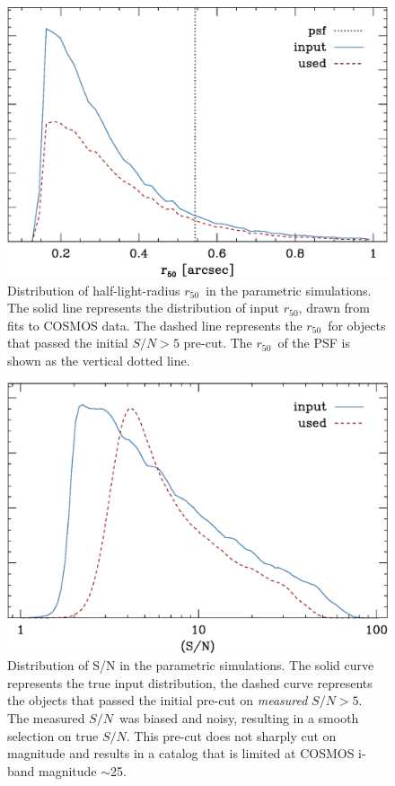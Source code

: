 \documentclass[iop, twocolappendix, appendixfloats, numberedappendix, apj]{emulateapj}
\newcommand{\snr}{$S/N$}
\newcommand{\hlr}{$r_{50}$}
\begin{document}
\begin{figure}
    \centering
    \includegraphics[width=\columnwidth]{run-bdj03mcal02-r50.eps}

    \caption{Distribution of half-light-radius \hlr\ in the parametric simulations.
        The solid line represents the distribution of input \hlr, drawn from fits
        to COSMOS data.  The dashed line represents the \hlr\ for objects that passed
		the initial $S/N > 5$ pre-cut.  The \hlr\ of the PSF is shown as the vertical dotted
        line.}

\label{fig:psimhlrcompare}
\end{figure}


\begin{figure}
    \centering
    \includegraphics[width=\columnwidth]{run-bdj03mcal02-s2n.eps}

    \caption{Distribution of S/N in the parametric simulations. The
    solid curve represents the true input distribution, the dashed curve 
	represents the objects that passed the initial pre-cut on {\it measured}
    \snr$ > 5$. The measured \snr\ was biased and noisy,
    resulting in a smooth selection on true \snr.  This pre-cut
    does not sharply cut on magnitude and results in a catalog that is
    limited at COSMOS i-band magnitude $\sim$25.}

\label{fig:s2n}
\end{figure}
\end{document}
